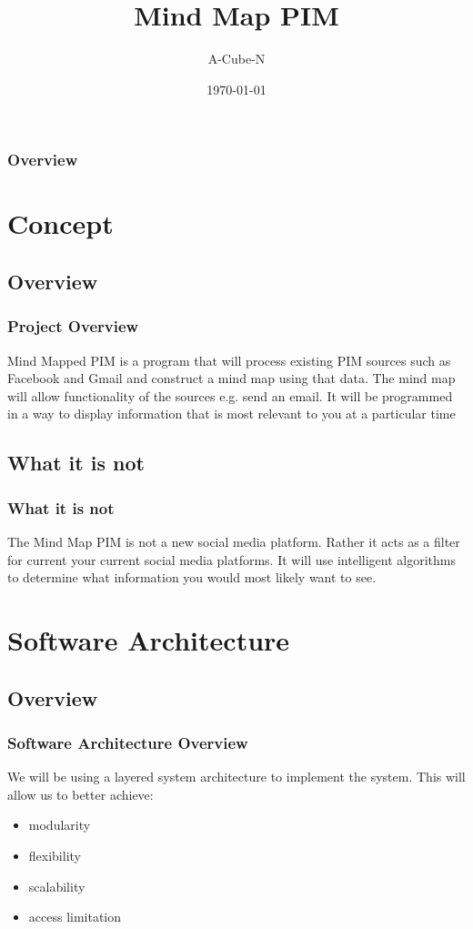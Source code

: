 \documentclass{beamer}
\title[Mind Map PIM]{Mind Map PIM}
\author{A-Cube-N}
\institute[UP]{
	Department of Computer Science, University of Pretoria
}
\date{\today}
\begin{document}
\begin{frame}
	\titlepage
\end{frame}

\begin{frame}
	\frametitle{Overview}
	\tableofcontents
\end{frame}

\section{Concept}
	\subsection{Overview}
		\begin{frame}
		\frametitle{Project Overview}
		Mind Mapped PIM is a program that will process existing PIM sources such as Facebook and Gmail and construct a mind map using that data. 
		The mind map will allow functionality of the sources e.g. send an email. It will be programmed in a way to display information that is most relevant to you at a particular time
		\end{frame}
	
	\subsection{What it is not}
		\begin{frame}
		\frametitle{What it is not}
		The Mind Map PIM is not a new social media platform. Rather it acts as a filter for current your current social media platforms.  It will use intelligent algorithms to determine what information you would most likely want to see.
		\end{frame}
		
\section{Software Architecture}
	\subsection{Overview}
		\begin{frame}
		\frametitle{Software Architecture Overview}
			We will be using a layered system architecture to implement the system. This will allow us to better achieve:
			\begin{itemize}
				\item modularity
				\item flexibility
				\item scalability
				\item access limitation
			\end{itemize}
		\end{frame}
		
\end{document}
